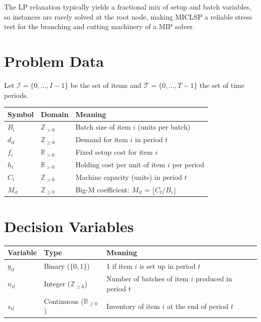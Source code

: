 \documentclass[11pt,a4paper]{article}
\begin{document}
The LP relaxation typically yields a fractional mix of setup and batch
variables, so instances are rarely solved at the root node, making MICLSP
a reliable stress test for the branching and cutting machinery of a MIP solver.

\section{Problem Data}

Let $\mathcal{I}=\{0,\ldots,I{-}1\}$ be the set of items and
$\mathcal{T}=\{0,\ldots,T{-}1\}$ the set of time periods.

\begin{center}
\begin{tabular}{@{}lll@{}}
\toprule
\textbf{Symbol} & \textbf{Domain} & \textbf{Meaning} \\
\midrule
$B_i$   & $\mathbb{Z}_{>0}$ & Batch size of item $i$ (units per batch) \\
$d_{it}$ & $\mathbb{Z}_{\ge 0}$ & Demand for item $i$ in period $t$ \\
$f_i$   & $\mathbb{R}_{>0}$ & Fixed setup cost for item $i$ \\
$h_i$   & $\mathbb{R}_{>0}$ & Holding cost per unit of item $i$ per period \\
$C_t$   & $\mathbb{Z}_{>0}$ & Machine capacity (units) in period $t$ \\
$M_{it}$& $\mathbb{Z}_{\ge 0}$ & Big-M coefficient: $M_{it}=\lfloor C_t/B_i\rfloor$ \\
\bottomrule
\end{tabular}
\end{center}

\section{Decision Variables}

\begin{center}
\begin{tabular}{@{}lll@{}}
\toprule
\textbf{Variable} & \textbf{Type} & \textbf{Meaning} \\
\midrule
$y_{it}$  & Binary ($\{0,1\}$) & 1 if item $i$ is set up in period $t$ \\
$n_{it}$  & Integer ($\mathbb{Z}_{\ge 0}$) & Number of batches of item $i$ produced in period $t$ \\
$s_{it}$  & Continuous ($\mathbb{R}_{\ge 0}$) & Inventory of item $i$ at the end of period $t$ \\
\bottomrule
\end{tabular}
\end{center}
\end{document}

